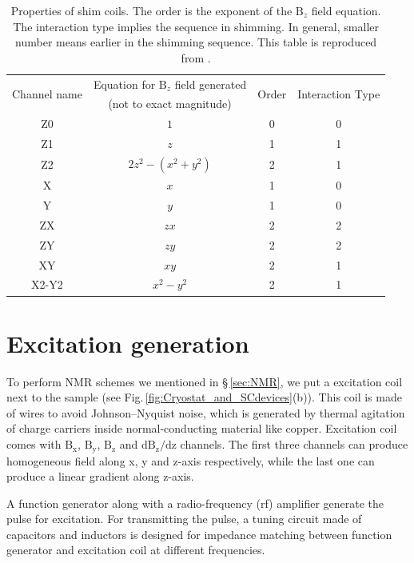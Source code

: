 \begin{table}[ht]
\centering
\caption{Properties of shim coils. The order is the exponent of the $\mathrm{B}_z$ field equation. The interaction type implies the sequence in shimming. In general, smaller number means earlier in the shimming sequence. This table is reproduced from \cite{Conover1999TheSO}. }
\begin{tabular}{cccc}
	\hline
	\multirow{2}{*}{Channel name} & Equation for $\mathrm{B}_z$ field generated & \multirow{2}{*}{Order} & \multirow{2}{*}{Interaction Type} \\
	 & (not to exact magnitude) & & \\
	\midrule
	Z0 & $1$ & 0 & 0 \\
	Z1 & $z$ & 1 & 1 \\
	Z2 & $2z^2 - (x^2 + y^2)$ & 2 & 1 \\
	X & $x$ & 1 & 0 \\
	Y & $y$ & 1 & 0 \\
	ZX & $zx$ & 2 & 2 \\
	ZY & $zy$ & 2 & 2 \\
	XY & $xy$ & 2 & 1 \\
	X2-Y2 & $x^2-y^2$ & 2 & 1 \\
	\bottomrule
\end{tabular}
\label{tab:shimproperity}
\end{table}


\section{Excitation generation}

To perform NMR schemes we mentioned in \S\,\ref{sec:NMR}, we put a excitation coil next to the sample (see Fig.\,\ref{fig:Cryostat_and_SCdevices}(b)). This coil is made of  wires to avoid Johnson–Nyquist noise, which is generated by thermal agitation of charge carriers inside normal-conducting material like copper. Excitation coil comes with $\mathrm{B_x}$, $\mathrm{B_y}$, $\mathrm{B_z}$ and $\mathrm{d B_z/dz}$ channels. The first three channels can produce homogeneous field along x, y and z-axis respectively, while the last one can produce a linear gradient along z-axis. 

A function generator along with a radio-frequency (rf) amplifier generate the pulse for excitation. For transmitting the pulse, a tuning circuit made of capacitors and inductors is designed for impedance matching between function generator and excitation coil at different frequencies. 



